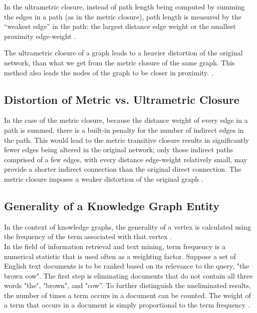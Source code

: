 \documentclass[10pt,11pt,12pt,oneside]{book}
\begin{document}
	In the ultrametric closure, instead of path length being computed by summing the edges in a path (as in the metric closure), path length is measured by the “weakest edge” in the path: the largest distance edge weight or the smallest proximity edge-weight \cite{SIMAS2015}.
	
	The ultrametric closure of a graph leads to a heavier distortion of the original network, than  what  we  get from  the metric closure of the same graph. This method also leads the nodes of the graph to be closer in proximity. \cite{SIMAS2015}. 
	
	\subsection{Distortion of Metric vs. Ultrametric Closure}
	
	In the case of the metric closure, because the distance weight of every edge in a path is summed,  there  is  a  built-in  penalty  for  the  number  of  indirect  edges  in  the  path. This would lead to the metric transitive closure results in significantly fewer edges being altered in the original network; only those indirect paths comprised of a few edges, with every distance edge-weight relatively small, may
	provide a shorter indirect connection than the original direct connection. The metric closure imposes a weaker distortion of the original graph \cite{SIMAS2015}.
	
	\subsection{Generality of a Knowledge Graph Entity}
	In the context of knowledge graphs, the generality of a vertex is calculated using the frequency of the term associated with that vertex \cite{sutton2004collective}.\\
	
	In the field of information retrieval and text mining, term frequency is a numerical statistic that is used often as a weighting factor.  Suppose a set of English text documents is to be ranked based on its relevance to the query, "the brown cow". The first step is eliminating documents that do not contain all three words "the", "brown", and "cow”. To further distinguish the uneliminated results, the number of times a term occurs in a document can be counted. The weight of a term that occurs in a document is simply proportional to the term frequency \cite{lao2011random}.\\
	
\end{document}
